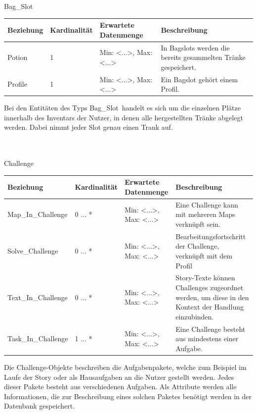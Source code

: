 \newpage
\begin{entity}{20}{Bag\_Slot}
\begin{center}
	\begin{longtable}{|m{4cm}|m{}|m{}|m{}|}
 	 \hline
 	 \textbf{Beziehung} & \textbf{Kardinalität} &  \textbf{Erwartete Datenmenge} & \textbf{Beschreibung} \\
  	\hline
  	Potion & 1  & Min: <...>, Max: <...> & In Bagslots werden die bereits gesammelten Tränke gespeichert.\\
	  \hline
  	Profile & 1  & Min: <...>, Max: <...> & Ein Bagslot gehört einem Profil.\\
	  \hline
	\end{longtable}
\end{center}
Bei den Entitäten des Typs \glqq Bag\_Slot\grqq~handelt es sich um die einzelnen Plätze innerhalb des Inventars der Nutzer, in denen alle hergestellten Tränke abgelegt werden. Dabei nimmt jeder Slot genau einen Trank auf. \\\\\
\end{entity}


\begin{entity}{30}{Challenge}
\begin{center}
	\begin{longtable}{|m{4cm}|m{}|m{}|m{}|}
 	 \hline
 	 \textbf{Beziehung} & \textbf{Kardinalität} &  \textbf{Erwartete Datenmenge} & \textbf{Beschreibung} \\
  	\hline
  	Map\_In\_Challenge & 0 ... *  & Min: <...>, Max: <...> & Eine Challenge kann mit mehreren Maps verknüpft sein.\\
  	\hline
  	Solve\_Challenge & 0 ... *  & Min: <...>, Max: <...> & Bearbeitungsfortschritt der Challenge, verknüpft mit dem Profil\\
	  \hline
  	Text\_In\_Challenge & 0 ... *  & Min: <...>, Max: <...> & Story-Texte können Challenges zugeordnet werden, um diese in den Kontext der Handlung einzubinden. \\
	  \hline
	Task\_In\_Challenge & 1 ... * & Min: <...>, Max: <...> & Eine Challenge besteht aus mindestens einer Aufgabe.\\
	  \hline
	\end{longtable}
\end{center}
Die \glqq Challenge\grqq-Objekte beschreiben die Aufgabenpakete, welche zum Beispiel im Laufe der Story oder als Hausaufgaben an die Nutzer gestellt werden. Jedes dieser Pakete besteht aus verschiedenen Aufgaben. Als Attribute werden alle Informationen, die zur Beschreibung eines solchen Paketes benötigt werden in der Datenbank gespeichert.\\\\\\\
\end{entity}

